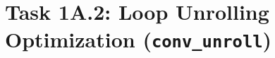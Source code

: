 \documentclass[11pt,a4paper]{article}
\begin{document}

\section{Task 1A.2: Loop Unrolling Optimization (\texttt{conv\_unroll})}


\end{document}
